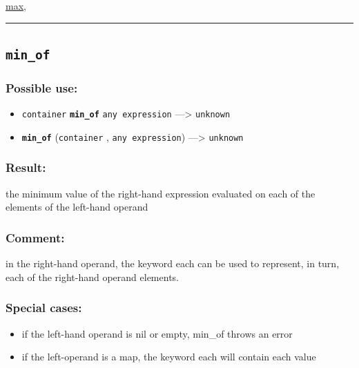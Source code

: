 \documentclass[]{book}
\providecommand{\tightlist}{%
  \setlength{\itemsep}{0pt}\setlength{\parskip}{0pt}}
\theoremstyle{definition}
\theoremstyle{definition}
\theoremstyle{definition}
\theoremstyle{remark}
\begin{document}
\href{operators-i-to-m.html\#max}{max},

\begin{center}\rule{0.5\linewidth}{\linethickness}\end{center}

\subsection{\texorpdfstring{\texttt{min\_of}}{min\_of}}\label{min_of}

\subsubsection{Possible use:}\label{possible-use-352}

\begin{itemize}
\tightlist
\item
  \texttt{container} \textbf{\texttt{min\_of}} \texttt{any\ expression}
  ---\textgreater{} \texttt{unknown}
\item
  \textbf{\texttt{min\_of}} (\texttt{container} ,
  \texttt{any\ expression}) ---\textgreater{} \texttt{unknown}
\end{itemize}

\subsubsection{Result:}\label{result-341}

the minimum value of the right-hand expression evaluated on each of the
elements of the left-hand operand

\subsubsection{Comment:}\label{comment-71}

in the right-hand operand, the keyword each can be used to represent, in
turn, each of the right-hand operand elements.

\subsubsection{Special cases:}\label{special-cases-99}

\begin{itemize}
\tightlist
\item
  if the left-hand operand is nil or empty, min\_of throws an error\\
\item
  if the left-operand is a map, the keyword each will contain each value
\end{itemize}
\end{document}
